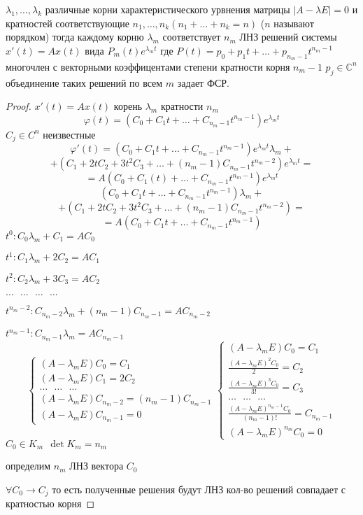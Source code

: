 \begin{theorem}
  $\lambda_1, \ldots, \lambda_k$ различные корни характеристического урвнения
  матрицы $|A - \lambda E| = 0$ и кратностей соответствующие $n_1, \ldots, n_k
  (n_1 + \ldots + n_k = n)$ ($n$ называют порядком) тогда каждому корню
  $\lambda_m$ соответствует $n_m$ ЛНЗ решений системы $x'(t) = Ax(t)$ вида
  $P_m(t) e^{\lambda_m t}$ где $P(t) = p_0 + p_1t + \ldots + p_{n_m-1}t^{n_m-1}$
  многочлен с векторными коэффицентами степени кратности корня $n_m - 1$
  $p_j \in \mathbb{C}^n$ объединение таких решений по всем $m$ задает ФСР.
\end{theorem}

\begin{proof}
  $x'(t) = Ax(t)$ корень $\lambda_m$ кратности $n_m$
  $$
  \varphi(t) = (C_0 + C_1 t + \ldots + C_{n_m-1}t^{n_m-1})e^{\lambda_m t}
  $$
  $C_j \in C^n$ неизвестные
  $$
  \varphi'(t) = (C_0 + C_1 t + \ldots + C_{n_m-1}t^{n_m-1})e^{\lambda_m t}
  \lambda_m +
  $$
  $$
  + (C_1 + 2tC_2 + 3t^2C_3 + \ldots + (n_m-1)C_{n_m-1}t^{n_m-2})
  e^{\lambda_m t} =
  $$
  $$
  = A(C_0 + C_1(t) + \ldots + C_{n_m-1}t^{n_m-1}) e^{\lambda_m t}
  $$
  $$
 (C_0 + C_1 t + \ldots + C_{n_m-1}t^{n_m-1})\lambda_m +
  $$
  $$
  + (C_1 + 2tC_2 + 3t^2C_3 + \ldots + (n_m-1)C_{n_m-1}t^{n_m-2}) =
  $$
  $$
  = A(C_0 + C_1t + \ldots + C_{n_m-1}t^{n_m-1})
  $$
  $t^0 : C_0 \lambda_m + C_1 = AC_0$

  $t^1 : C_1 \lambda_m + 2C_2 = AC_1$

  $t^2 : C_2 \lambda_m + 3C_3 = AC_2$

  $\ldots ~~~ \ldots ~~~ \ldots ~~~ \ldots$

  $t^{n_m-2} : C_{n_m-2} \lambda_m + (n_m - 1)C_{n_m - 1} = AC_{n_m - 2}$

  $t^{n_m-1} : C_{n_m-1} \lambda_m = AC_{n_m - 1}$
  $$
  \left\{
  \begin{array}{l}
    (A - \lambda_mE) C_0 = C_1 \\
    (A - \lambda_mE) C_1 = 2C_2 \\
    \ldots ~~~ \ldots ~~~ \ldots \\
    (A - \lambda_mE) C_{n_m-2} = (n_m-1)C_{n_m-1} \\
    (A - \lambda_mE) C_{n_m-1} = 0
  \end{array}
  \right.
  \left\{
  \begin{array}{l}
    (A - \lambda_mE) C_0 = C_1 \\
    \frac{(A - \lambda_mE)^2 C_0}{2} = C_2 \\
    \frac{(A - \lambda_mE)^3 C_0}{3!} = C_3 \\
    \ldots ~~~ \ldots ~~~ \ldots \\
    \frac{(A - \lambda_mE)^{n_m-1} C_0}{(n_m-1)!} = C_{n_m-1} \\
    (A - \lambda_mE)^{n_m}C_0 = 0
  \end{array}
  \right.
  $$
  $C_0 \in K_m ~~ \det K_m = n_m$

  определим $n_m$ ЛНЗ вектора $C_0$

  $\forall C_0 \to C_j$ то есть полученные решения будут ЛНЗ кол-во решений
  совпадает с кратностью корня
\end{proof}


